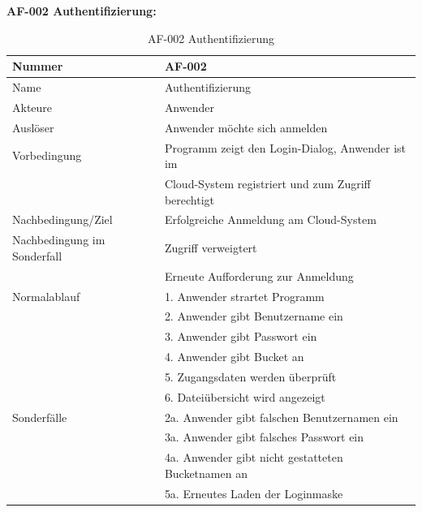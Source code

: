 \documentclass[12pt,a4paper,bibliography=totocnumbered,listof=totocnumbered]{scrartcl}
\begin{document}
\textbf{AF-002 Authentifizierung:}
\begin{table}[!h]
	\centering
	\begin{tabular}{|l|l|}
		\hline
		Nummer & AF-002\\
		\hline
		Name & Authentifizierung\\
		\hline
		Akteure & Anwender\\
		\hline
		Auslöser & Anwender möchte sich anmelden\\
		\hline
		Vorbedingung & Programm zeigt den Login-Dialog, Anwender ist im \\ &  Cloud-System registriert und zum Zugriff berechtigt\\
		\hline
		Nachbedingung/Ziel & Erfolgreiche Anmeldung am Cloud-System \\
		\hline
		Nachbedingung im Sonderfall & Zugriff verweigtert\\ & Erneute Aufforderung zur Anmeldung\\
		\hline
		Normalablauf & 1. Anwender strartet Programm \\ & 2. Anwender gibt Benutzername ein \\ & 3. Anwender gibt Passwort ein \\ & 4. Anwender gibt Bucket an \\ &5. Zugangsdaten werden überprüft \\ & 6. Dateiübersicht wird angezeigt \\
		\hline
		Sonderfälle & 2a. Anwender gibt falschen Benutzernamen ein \\ & 3a. Anwender gibt falsches Passwort ein \\& 4a. Anwender gibt nicht gestatteten Bucketnamen an\\ & 5a. Erneutes Laden der Loginmaske\\
		\hline
	\end{tabular}
	\caption{AF-002 Authentifizierung}
	\label{tab:AF-002 Authentifizierung}
\end{table}
\pagebreak
\end{document}
